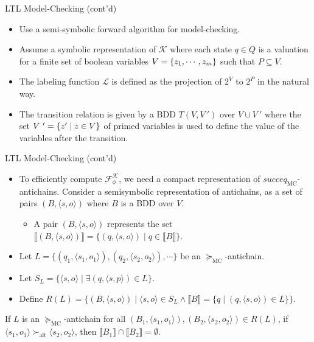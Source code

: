 \documentclass[12pt]{beamer}
\begin{document}
\begin{frame}{LTL Model-Checking (cont'd)}
	\begin{itemize}
		\item Use a semi-symbolic forward algorithm for model-checking.
		\item Assume
		a symbolic representation of $\mathcal{K}$ where each state $q \in Q$ is a valuation for a finite set
		of boolean variables $V = \{\mathnormal{z}_{1}, \cdots , \mathnormal{z}_{\mathnormal{m}}\}$ such that $P \subseteq V$.
		\item The labeling function $\mathcal{L}$ is defined as the projection of $2^{V}$ to $2^{P}$ in the natural way.
		\item The transition relation is given
		by a BDD $T(V, V~')$ over $V \cup V~'$ where the set $V~' = \{\mathnormal{z}' \mid \mathnormal{z} \in V\}$ of primed variables
		is used to define the value of the variables after the transition.
	\end{itemize}
\end{frame}

\begin{frame}{LTL Model-Checking (cont'd)}
	\begin{itemize}
		\item To efficiently compute $\mathcal{F}_{\phi}^{\mathcal{K}}$, we need a compact representation of $succeq_{\text{MC}}$-antichains. Consider a semisymbolic representation of antichains, as a set of pairs $(B, \langle s, o \rangle)$ where $B$ is a BDD over $V$.
		\begin{itemize}
			\item A pair $(B, \langle s, o \rangle)$ represents the set $\llbracket (B, \langle s, o \rangle) \rrbracket = \{(q, \langle s, o \rangle) \mid q \in \llbracket B \rrbracket\}$.
		\end{itemize}
		\item Let $L = \{(q_{1}, \langle s_{1},  o_{1} \rangle), (q_{2}, \langle s_{2}, o_{2} \rangle), \cdots \}$ be an $\succeq_{\text{MC}}$-antichain.
		\item Let $S_{L} = \{\langle s, o \rangle \mid \exists (q, \langle s, p \rangle) \in L\}$.
		\item Define $R(L) = \{(B, \langle s, o \rangle) \mid \langle s, o \rangle \in S_{L} \land \llbracket B \rrbracket = \{q \mid (q, \langle s, o \rangle) \in L \} \}$.
	\end{itemize}
	\begin{lemma}
		If $L$ is an $\succeq_{\text{MC}}$-antichain for all $(B_{1}, \langle s_{1}, o_{1} \rangle), (B_{2}, \langle s_{2}, o_{2} \rangle) \in R(L)$, if $\langle s_{1}, o_{1} \rangle \succ_{\text{alt}} \langle s_{2}, o_{2} \rangle$, then $\llbracket B_{1} \rrbracket \cap \llbracket B_{2} \rrbracket = \emptyset$.
	\end{lemma}
\end{frame}
\end{document}
